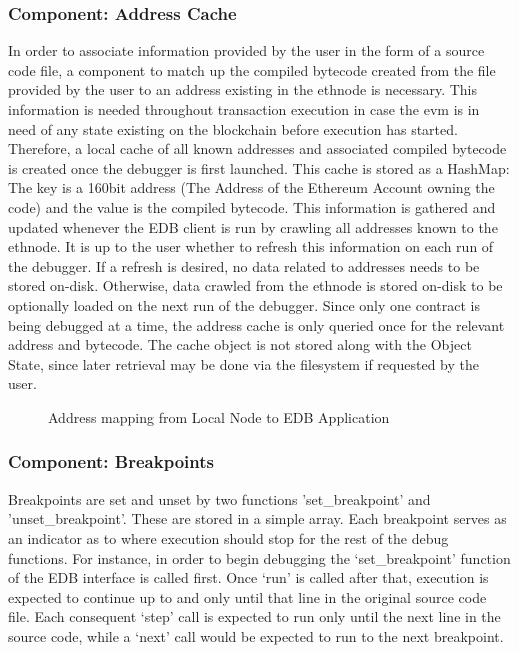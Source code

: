 \documentclass{report}
\begin{document}
    \subsubsection{Component: Address Cache}
        In order to associate information provided by the user in the form of a source code file, a component to match up the compiled bytecode created from the file provided by the user to an address existing in the \Gls{ethnode} is necessary. This information is needed throughout transaction execution in case the \Gls{evm} is in need of any state existing on the blockchain before execution has started. Therefore, a local cache of all known addresses and associated compiled bytecode is created once the debugger is first launched. This cache is stored as a HashMap: The key is a 160bit address (The Address of the Ethereum Account owning the code) and the value is the compiled bytecode. This information is gathered and updated whenever the EDB client is run by crawling all addresses known to the \Gls{ethnode}. It is up to the user whether to refresh this information on each run of the debugger. If a refresh is desired, no data related to addresses needs to be stored on-disk.  Otherwise, data crawled from the \Gls{ethnode} is stored on-disk to be optionally loaded on the next run of the debugger. Since only one contract is being debugged at a time, the address cache is only queried once for the relevant address and bytecode. The cache object is not stored along with the Object State, since later retrieval may be done via the filesystem if requested by the user.
    \begin{figure}[!h]
        \caption{Address mapping from Local Node to EDB Application}
    \end{figure}

    \subsubsection{Component: Breakpoints}
        Breakpoints are set and unset by two functions 'set\_breakpoint' and 'unset\_breakpoint'. These are stored in a simple array. Each breakpoint serves as an indicator as to where execution should stop for the rest of the debug functions. For instance, in order to begin debugging the `set\_breakpoint' function of the EDB interface is called first. Once `run' is called after that, execution is expected to continue up to and only until that line in the original source code file. Each consequent `step' call is expected to run only until the next line in the source code, while a `next' call would be expected to run to the next breakpoint.
\end{document}
